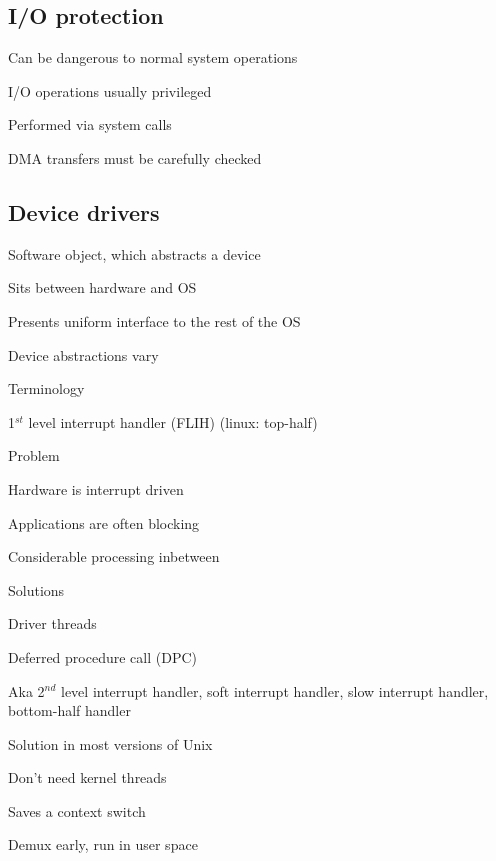 \subsection{I/O protection}
\enumstart
	\item Can be dangerous to normal system operations
	\item I/O operations usually privileged
	\item Performed via system calls
	\item DMA transfers must be carefully checked
\enumend

\subsection{Device drivers}
\enumstart
	\item Software object, which abstracts a device
	\item Sits between hardware and OS
	\item Presents uniform interface to the rest of the OS
	\item Device abstractions vary
	\item Terminology
	\enumstart
		\item 1$^{st}$ level interrupt handler (FLIH) (linux: top-half)
	\enumend
	\item Problem
	\enumstart
		\item Hardware is interrupt driven
		\item Applications are often blocking
		\item Considerable processing inbetween
	\enumend
	\item Solutions
	\enumstart
		\item Driver threads
		\item Deferred procedure call (DPC)
		\enumstart
			\item Aka 2$^{nd}$ level interrupt handler, soft interrupt handler, slow interrupt handler, bottom-half handler
			\item Solution in most versions of Unix
			\item Don't need kernel threads
			\item Saves a context switch
		\enumend
		\item Demux early, run in user space
	\enumend
\enumend


